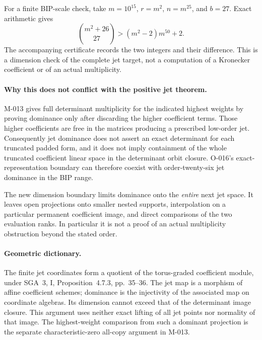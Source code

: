 For a finite BIP-scale check, take $m=10^{15}$,
$r=m^2$, $n=m^{25}$, and $b=27$. Exact arithmetic gives
\[
                \binom{m^2+26}{27}>(m^2-2)m^{50}+2.
\]
The accompanying certificate records the two integers and
their difference. This is a dimension check of the complete
jet target, not a computation of a Kronecker coefficient or
of an actual multiplicity.

\paragraph{Why this does not conflict with the positive jet theorem.}
M-013 gives full determinant multiplicity for the indicated
highest weights by proving dominance only after discarding
the higher coefficient terms. Those higher coefficients are
free in the matrices producing a prescribed low-order jet.
Consequently jet dominance does not assert an exact determinant
for each truncated padded form, and it does not imply
containment of the whole truncated coefficient linear space
in the determinant orbit closure. O-016's exact-representation
boundary can therefore coexist with order-twenty-six jet
dominance in the BIP range.

The new dimension boundary limits dominance onto the
\emph{entire} next jet space. It leaves open projections
onto smaller nested supports, interpolation on a particular
permanent coefficient image, and direct comparisons of the
two evaluation ranks. In particular it is not a proof of
an actual multiplicity obstruction beyond the stated order.

\paragraph{Geometric dictionary.}
The finite jet coordinates form a quotient of the torus-graded
coefficient module, under SGA~3, I, Proposition~4.7.3,
pp.~35--36. The jet map is a morphism of affine coefficient
schemes; dominance is the injectivity of the associated
map on coordinate algebras. Its dimension cannot exceed
that of the determinant image closure. This argument uses
neither exact lifting of all jet points nor normality of
that image. The highest-weight comparison from such a
dominant projection is the separate characteristic-zero
all-copy argument in M-013.
